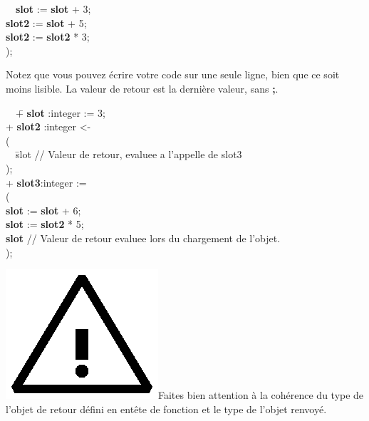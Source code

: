 \documentclass[11pt]{mybook}
\newcommand{\warning}{\includegraphics[scale=0.3]{figures/warning}}
\begin{document}
{{\begin{tabbing}
  \>~~\= {\bf{}slot}  := {\bf{}slot} + 3;\\
  \>  \> {\bf{}slot2} := {\bf{}slot} + 5;\\
  \>  \> {\bf{}slot2} := {\bf{}slot2} * 3;\\
  \> );
\end{tabbing}}
Notez que vous pouvez \'ecrire votre code sur une seule ligne, bien que ce soit moins lisible.
La valeur de retour est la dernière valeur, sans {\bf{} ;}.
{\tt\begin{tabbing}
~~\= + {\bf{}slot}  :{\sc{}integer}  := 3; \\
  \> + {\bf{}slot2} :{\sc{}integer}  <-\\
  \> (\\
  \>~~\=slot              // Valeur de retour, evaluee a l'appelle de slot3\\
  \> );\\
  \> + {\bf{}slot3}:{\sc{}integer}  := \\
  \> (\\
  \>  \> {\bf{}slot} := {\bf{}slot} + 6; \\
  \>  \> {\bf{}slot} := {\bf{}slot2} * 5; \\
  \>  \> {\bf{}slot}              // Valeur de retour evaluee lors du chargement de l'objet.\\
  \> ); \\
\end{tabbing}}
\warning{Faites bien attention \`a la coh\'erence du type de l'objet de
retour d\'efini en entête de fonction et le type de l'objet renvoy\'e.\\ 
}
}
\end{document}
